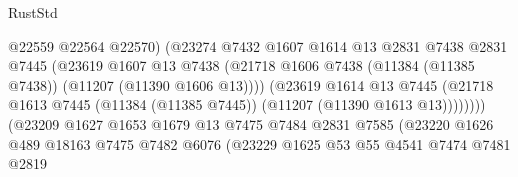 \begin{lexlean}{RustStd}
\begin{coremodule}
                                          @22559
                                          @22564
                                          @22570)
                                        (@23274
                                          @7432
                                          @1607
                                          @1614
                                          @13
                                          @2831
                                          @7438
                                          @2831
                                          @7445
                                          (@23619
                                            @1607
                                            @13
                                            @7438
                                            (@21718
                                              @1606
                                              @7438
                                              (@11384 (@11385 @7438))
                                              (@11207 (@11390 @1606 @13))))
                                          (@23619
                                            @1614
                                            @13
                                            @7445
                                            (@21718
                                              @1613
                                              @7445
                                              (@11384 (@11385 @7445))
                                              (@11207 (@11390 @1613 @13))))))))
                                  (@23209
                                    @1627
                                    @1653
                                    @1679
                                    @13
                                    @7475
                                    @7484
                                    @2831
                                    @7585
                                    (@23220
                                      @1626
                                      @489
                                      @18163
                                      @7475
                                      @7482
                                      @6076
                                      (@23229
                                        @1625
                                        @53
                                        @55
                                        @4541
                                        @7474
                                        @7481
                                        @2819

\end{coremodule}
\end{lexlean}

